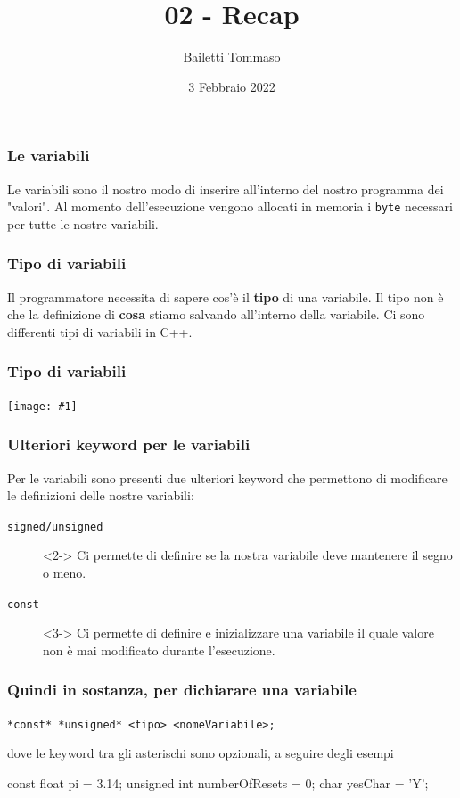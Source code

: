\documentclass[handout]{beamer}
\title{02 - Recap}
\author{Bailetti Tommaso}
\institute{ITI Don Orione}
\date{3 Febbraio 2022}
\newcommand{\scaledimage}[1]{\texttt{[image: \#1]}}
\begin{document}
    \begin{frame}
        \titlepage
    \end{frame}

    \begin{frame}
        \frametitle{Le variabili}
        Le variabili sono il nostro modo di inserire all'interno del nostro programma dei "valori". Al momento dell'esecuzione vengono allocati in memoria i \texttt{byte} necessari per tutte le nostre variabili.
    \end{frame}
    
    \begin{frame}
        \frametitle{Tipo di variabili}
        Il programmatore necessita di sapere cos'è il \textbf{tipo} di una variabile. Il tipo non è che la definizione di \textbf{cosa} stiamo salvando all'interno della variabile. Ci sono differenti tipi di variabili in C++.
    \end{frame}
    
    \begin{frame}
        \frametitle{Tipo di variabili}
        \begin{center}
            \scaledimage{img/types.png}
        \end{center}
    \end{frame}

    \begin{frame}
        \frametitle{Ulteriori keyword per le variabili}
        Per le variabili sono presenti due ulteriori keyword che permettono di modificare le definizioni delle nostre variabili:
        \begin{description}
            \item[\texttt{signed/unsigned}]<2-> Ci permette di definire se la nostra variabile deve mantenere il segno o meno.
            \item[\texttt{const}]<3-> Ci permette di definire e inizializzare una variabile il quale valore non è mai modificato durante l'esecuzione. 
        \end{description}
    \end{frame}

    \begin{frame}[fragile]
        \frametitle{Quindi in sostanza, per dichiarare una variabile}
        \begin{center}
            \Large{\texttt{*const* *unsigned* <tipo> <nomeVariabile>;}}
        \end{center}
        dove le keyword tra gli asterischi sono opzionali, a seguire degli esempi
        \begin{center}
            \begin{cppcode}
                const float pi = 3.14;
                unsigned int numberOfResets = 0;
                char yesChar = 'Y';
            \end{cppcode}
        \end{center}
    \end{frame}
\end{document}
